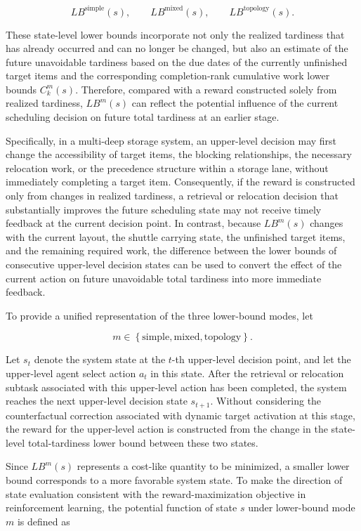 \[
LB^{\mathrm{simple}}(s),
\qquad
LB^{\mathrm{mixed}}(s),
\qquad
LB^{\mathrm{topology}}(s).
\]

These state-level lower bounds incorporate not only the realized tardiness that
has already occurred and can no longer be changed, but also an estimate of the
future unavoidable tardiness based on the due dates of the currently unfinished
target items and the corresponding completion-rank cumulative work lower bounds
\(C_k^m(s)\). Therefore, compared with a reward constructed solely from realized
tardiness, \(LB^m(s)\) can reflect the potential influence of the current
scheduling decision on future total tardiness at an earlier stage.

Specifically, in a multi-deep storage system, an upper-level decision may first
change the accessibility of target items, the blocking relationships, the
necessary relocation work, or the precedence structure within a storage lane,
without immediately completing a target item. Consequently, if the reward is
constructed only from changes in realized tardiness, a retrieval or relocation
decision that substantially improves the future scheduling state may not receive
timely feedback at the current decision point. In contrast, because
\(LB^m(s)\) changes with the current layout, the shuttle carrying state, the
unfinished target items, and the remaining required work, the difference
between the lower bounds of consecutive upper-level decision states can be used
to convert the effect of the current action on future unavoidable total
tardiness into more immediate feedback.

To provide a unified representation of the three lower-bound modes, let

\[
m
\in
\left\{
\mathrm{simple},
\mathrm{mixed},
\mathrm{topology}
\right\}.
\]

Let \(s_t\) denote the system state at the \(t\)-th upper-level decision point,
and let the upper-level agent select action \(a_t\) in this state. After the
retrieval or relocation subtask associated with this upper-level action has been
completed, the system reaches the next upper-level decision state
\(s_{t+1}\). Without considering the counterfactual correction associated with
dynamic target activation at this stage, the reward for the upper-level action
is constructed from the change in the state-level total-tardiness lower bound
between these two states.

Since \(LB^m(s)\) represents a cost-like quantity to be minimized, a smaller
lower bound corresponds to a more favorable system state. To make the direction
of state evaluation consistent with the reward-maximization objective in
reinforcement learning, the potential function of state \(s\) under
lower-bound mode \(m\) is defined as

